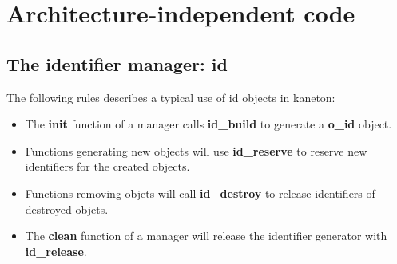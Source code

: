 
%
%

\chapter{Architecture-independent code}

\newpage

\section{The identifier manager: id}

The following rules describes a typical use of id objects in kaneton:

\begin{itemize}

\item The \textbf{init} function of a manager calls \textbf{id\_build}
to generate a \textbf{o\_id} object.

\item Functions generating new objects will use \textbf{id\_reserve} to
reserve new identifiers for the created objects.

\item Functions removing objets will call \textbf{id\_destroy} to release
identifiers of destroyed objets.

\item The \textbf{clean} function of a manager will release the identifier
generator with \textbf{id\_release}.

\end{itemize}


